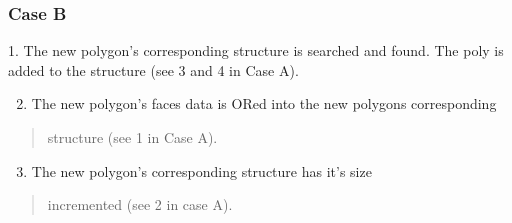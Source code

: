 \documentclass[letterpaper,10pt,english]{sphinxmanual}
\begin{document}
\subsubsection{Case B}
\label{dfngen:case-b}
1.      The new polygon’s corresponding  structure
is searched and found. The poly is added to the  structure (see
3 and 4 in Case A).
\begin{enumerate}
\setcounter{enumi}{1}
\item {} 
The new polygon’s faces data is ORed into the new polygons corresponding

\end{enumerate}
\begin{quote}

 structure (see 1 in Case A).
\end{quote}
\begin{enumerate}
\setcounter{enumi}{2}
\item {} 
The new polygon’s corresponding  structure has it’s size

\end{enumerate}
\begin{quote}

incremented (see 2 in case A).
\end{quote}
\end{document}
